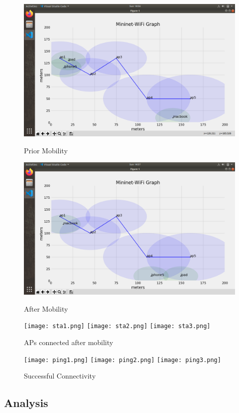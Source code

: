 \documentclass{article}
\begin{document}
    	\begin{figure}[h]
        			\includegraphics[width=0.9\linewidth]{beforeMobility.png}
        			\caption{Prior Mobility}
       			\label{fig:t1-3}
        		\endminipage
        			\includegraphics[width=0.9\linewidth]{afterMobility.png}
        			\caption{After Mobility}
        			\label{fig:t1-4}
        		\endminipage\vspace{10pt}
        			\texttt{[image: sta1.png]}
        			\texttt{[image: sta2.png]}
        			\texttt{[image: sta3.png]}
        			\caption{APs connected after mobility}
        			\label{fig:t1-5}
        		\endminipage\vspace{10pt}
        			\texttt{[image: ping1.png]}
        			\texttt{[image: ping2.png]}
       			\texttt{[image: ping3.png]}
        			\caption{Successful Connectivity}
        			\label{fig:t1-6}
        		\endminipage
    	\end{figure}

\newpage
\subsection{Analysis}
\end{document}
